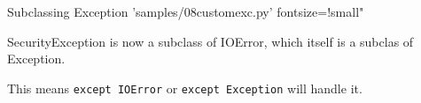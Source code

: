 \documentclass{pyslides}
\begin{document}
\begin{frame}[fragile]{Subclassing Exception}
 'samples/08customexc.py' fontsize=!small"

\bigskip

SecurityException is now a subclass of IOError, which itself is a subclas of Exception.

This means \verb+except IOError+ or \verb+except Exception+ will handle it.
\end{frame}
\end{document}
